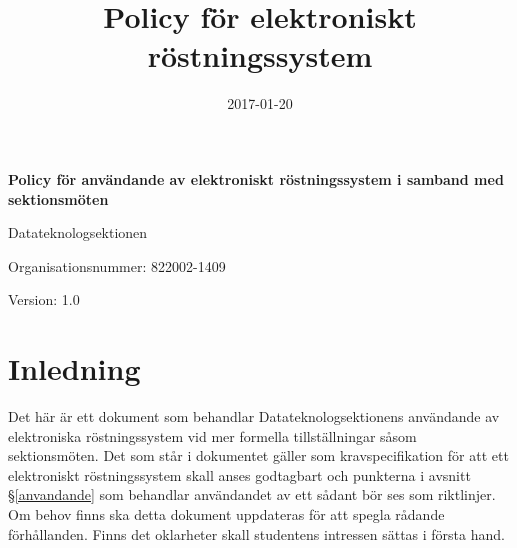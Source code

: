 \documentclass{datateknologsektionen-document}
\title{Policy för elektroniskt röstningssystem}
\date{2017-01-20}
\begin{document}
\hspace{0pt}
\vfill
\begin{center}
  \Huge\textbf{Policy för användande av elektroniskt röstningssystem i samband med sektionsmöten}

  \huge Datateknologsektionen

  \large
  Organisationsnummer: 822002-1409

  Version: 1.0

\end{center}
\vfill
\hspace{0pt}
\pagebreak



\tableofcontents

\pagebreak

\section{Inledning}
Det här är ett dokument som behandlar Datateknologsektionens användande av elektroniska
röstningssystem vid mer formella tillställningar såsom sektionsmöten. Det som står i dokumentet
gäller som kravspecifikation för att ett elektroniskt röstningssystem skall anses godtagbart och
punkterna i avsnitt \S \ref{anvandande} som behandlar användandet av ett sådant bör ses som riktlinjer. Om behov
finns ska detta dokument uppdateras för att spegla rådande förhållanden. Finns det oklarheter skall
studentens intressen sättas i första hand.
\end{document}
